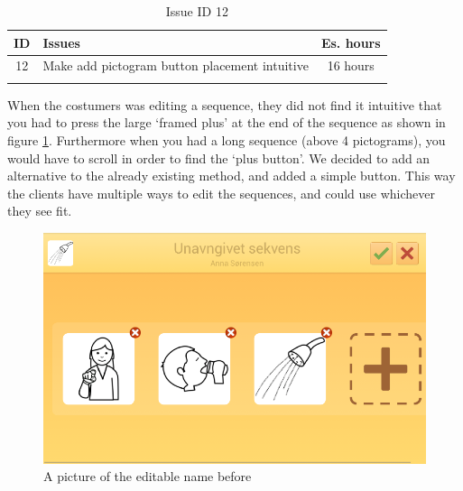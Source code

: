 \begin{longtable} { | c | p{12cm} | c | } 
\hline
	ID 	&	Issues	&		 Es. hours \\\hline
	12 	&	Make add pictogram button placement intuitive	&	16 hours \\\hline
\caption{Issue ID 12}
\label{tab:spr3_addsequencenotintuitive}
\end{longtable}

When the costumers was editing a sequence, they did not find it intuitive that you had to press the large `framed plus' at the end of the sequence as shown in figure \ref{fig:Old_editSequence}. Furthermore when you had a long sequence (above 4 pictograms), you would have to scroll in order to find the `plus button'. We decided to add an alternative to the already existing method, and added a simple button.  This way the clients have multiple ways to edit the sequences, and could use whichever they see fit.

\begin{figure} [h!]
\centering
\begin{minipage}{.7\textwidth}
\centering
\includegraphics{Pics/Sprint3/EditModeCropped}
\caption{A picture of the editable name before}
\label{fig:Old_editSequence}
\end{minipage}\hfill
\end{figure}